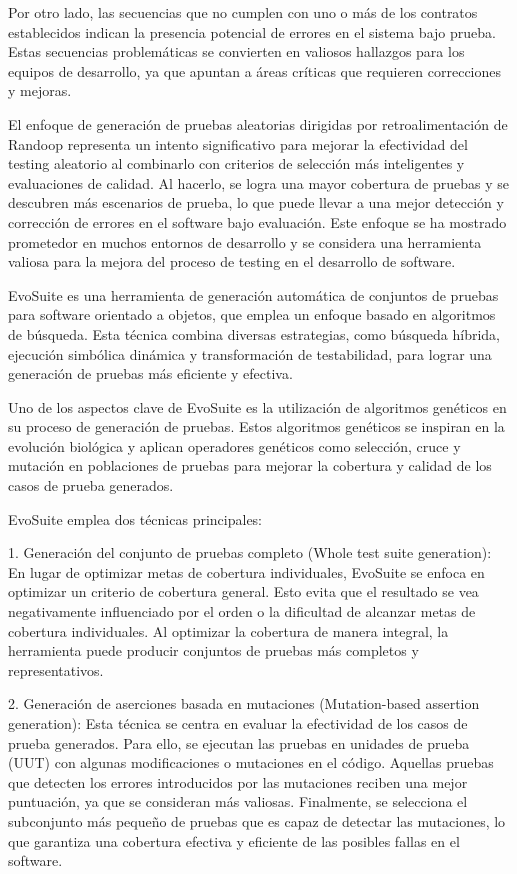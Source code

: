 Por otro lado, las secuencias que no cumplen con uno o más de los contratos establecidos indican la presencia potencial de errores en el sistema bajo prueba. Estas secuencias problemáticas se convierten en valiosos hallazgos para los equipos de desarrollo, ya que apuntan a áreas críticas que requieren correcciones y mejoras.

El enfoque de generación de pruebas aleatorias dirigidas por retroalimentación de Randoop representa un intento significativo para mejorar la efectividad del testing aleatorio al combinarlo con criterios de selección más inteligentes y evaluaciones de calidad. Al hacerlo, se logra una mayor cobertura de pruebas y se descubren más escenarios de prueba, lo que puede llevar a una mejor detección y corrección de errores en el software bajo evaluación. Este enfoque se ha mostrado prometedor en muchos entornos de desarrollo y se considera una herramienta valiosa para la mejora del proceso de testing en el desarrollo de software.


EvoSuite es una herramienta de generación automática de conjuntos de pruebas para software orientado a objetos, que emplea un enfoque basado en algoritmos de búsqueda. Esta técnica combina diversas estrategias, como búsqueda híbrida, ejecución simbólica dinámica y transformación de testabilidad, para lograr una generación de pruebas más eficiente y efectiva.

Uno de los aspectos clave de EvoSuite es la utilización de algoritmos genéticos en su proceso de generación de pruebas. Estos algoritmos genéticos se inspiran en la evolución biológica y aplican operadores genéticos como selección, cruce y mutación en poblaciones de pruebas para mejorar la cobertura y calidad de los casos de prueba generados.

EvoSuite emplea dos técnicas principales:

1. Generación del conjunto de pruebas completo (Whole test suite generation):
En lugar de optimizar metas de cobertura individuales, EvoSuite se enfoca en optimizar un criterio de cobertura general. Esto evita que el resultado se vea negativamente influenciado por el orden o la dificultad de alcanzar metas de cobertura individuales. Al optimizar la cobertura de manera integral, la herramienta puede producir conjuntos de pruebas más completos y representativos.

2. Generación de aserciones basada en mutaciones (Mutation-based assertion generation):
Esta técnica se centra en evaluar la efectividad de los casos de prueba generados. Para ello, se ejecutan las pruebas en unidades de prueba (UUT) con algunas modificaciones o mutaciones en el código. Aquellas pruebas que detecten los errores introducidos por las mutaciones reciben una mejor puntuación, ya que se consideran más valiosas. Finalmente, se selecciona el subconjunto más pequeño de pruebas que es capaz de detectar las mutaciones, lo que garantiza una cobertura efectiva y eficiente de las posibles fallas en el software.

